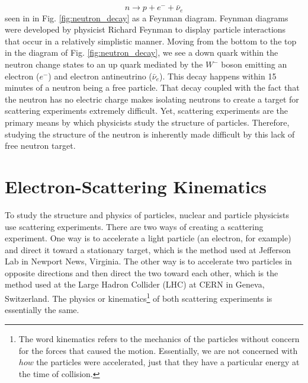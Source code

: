 \begin{equation}
n \longrightarrow p + e^{-} + \bar{\nu}_{e}
\end{equation}
seen in in Fig. \ref{fig:neutron_decay} as a Feynman diagram. Feynman diagrams were developed by physicist Richard Feynman to display particle interactions that occur in a relatively simplistic manner. Moving from the bottom to the top in the diagram of Fig. \ref{fig:neutron_decay}, we see a down quark within the neutron change states to an up quark mediated by the $W^-$ boson emitting an electron ($e^-$) and electron antineutrino ($\bar{\nu}_{e}$). This decay happens within 15 minutes of a neutron being a free particle. That decay coupled with the fact that the neutron has no electric charge makes isolating neutrons to create a target for scattering experiments extremely difficult. Yet, scattering experiments are the primary means by which physicists study the structure of particles. Therefore, studying the structure of the neutron is inherently made difficult by this lack of free neutron target.

\section{Electron-Scattering Kinematics}
To study the structure and physics of particles, nuclear and particle physicists use scattering experiments. There are two ways of creating a scattering experiment. One way is to accelerate a light particle (an electron, for example) and direct it toward a stationary target, which is the method used at Jefferson Lab in Newport News, Virginia. The other way is to accelerate two particles in opposite directions and then direct the two toward each other, which is the method used at the Large Hadron Collider (LHC) at CERN in Geneva, Switzerland. The physics or kinematics\footnote{The word kinematics refers to the mechanics of the particles without concern for the forces that caused the motion. Essentially, we are not concerned with $how$ the particles were accelerated, just that they have a particular energy at the time of collision.} of both scattering experiments is essentially the same. 

